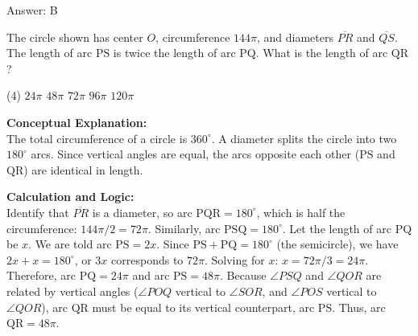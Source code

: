\documentclass[11pt,paper=a4,answers]{exam}
\begin{document}
\begin{questions}
\begin{solution}
\vspace{30pt}

Answer: \colorbox{yellow!100}{B}
\end{solution}

\vspace{60pt}

\question
\begin{center}
\end{center}
The circle shown has center $O$, circumference $144\pi$, and diameters $\overline{PR}$ and $\overline{QS}$. The length of arc $\text{PS}$ is twice the length of arc $\text{PQ}$. What is the length of arc $\text{QR}$?
\begin{tasks}(4)
    \task $24\pi$
    \task $48\pi$
    \task $72\pi$
    \task $96\pi$
    \task $120\pi$
\end{tasks}

\begin{solution}
\textbf{Conceptual Explanation:} \\
The total circumference of a circle is $360^\circ$. A diameter splits the circle into two $180^\circ$ arcs. Since vertical angles are equal, the arcs opposite each other ($\text{PS}$ and $\text{QR}$) are identical in length.

\vspace{30pt}

\textbf{Calculation and Logic:} \\
Identify that $\overline{PR}$ is a diameter, so arc $\text{PQR} = 180^\circ$, which is half the circumference: $144\pi / 2 = 72\pi$. Similarly, arc $\text{PSQ} = 180^\circ$. Let the length of arc $\text{PQ}$ be $x$. We are told arc $\text{PS} = 2x$. Since $\text{PS} + \text{PQ} = 180^\circ$ (the semicircle), we have $2x + x = 180^\circ$, or $3x$ corresponds to $72\pi$. Solving for $x$: $x = 72\pi / 3 = 24\pi$. Therefore, arc $\text{PQ} = 24\pi$ and arc $\text{PS} = 48\pi$. Because $\angle PSQ$ and $\angle QOR$ are related by vertical angles ($\angle POQ$ vertical to $\angle SOR$, and $\angle POS$ vertical to $\angle QOR$), arc $\text{QR}$ must be equal to its vertical counterpart, arc $\text{PS}$. Thus, arc $\text{QR} = 48\pi$.


\end{solution}
\end{questions}
\end{document}
